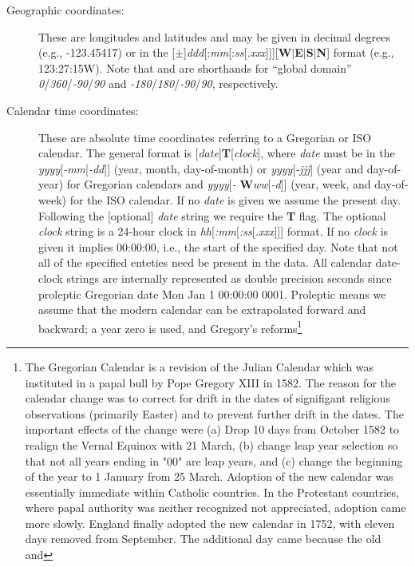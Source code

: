\begin{description}
\item [Geographic coordinates:]  These are longitudes and latitudes and may be given in decimal degrees (e.g., -123.45417)
or in the
[$\pm$]\emph{ddd}[:\emph{mm}[:\emph{ss}[\emph{.xxx}]]][\textbf{W}$|$\textbf{E}$|$\textbf{S}$|$\textbf{N}]
format (e.g., 123:27:15W).  Note that  and  are shorthands for ``global domain''
\emph{0}/\emph{360}/\emph{-90}/\emph{90}
and  \emph{-180}/\emph{180}/\emph{-90}/\emph{90}, respectively.
\item [Calendar time coordinates:]  These are absolute time coordinates referring to a Gregorian or ISO calendar.
The general format is [\emph{date}]\textbf{T}[\emph{clock}], where \emph{date} must be in the
\emph{yyyy}[\emph{-mm}[\emph{-dd}]] (year, month, day-of-month)
or \emph{yyyy}[\emph{-jjj}] (year and day-of-year) for Gregorian calendars and \emph{yyyy}[\emph{-}{\bf
W}\emph{ww}[\emph{-d}]] (year, week, and
day-of-week) for the ISO calendar.  If no \emph{date} is given we assume the present day.  Following the
[optional] \emph{date} string we require the \textbf{T} flag.
The optional \emph{clock} string is a 24-hour clock in \emph{hh}[\emph{:mm}[\emph{:ss}[\emph{.xxx}]]] format.
If no \emph{clock} is given
it implies 00:00:00, i.e., the start of the specified day.
Note that not all of the specified enteties need be present in the data.  All calendar date-clock strings are internally represented as double precision seconds since
proleptic Gregorian date Mon Jan 1 00:00:00 0001.  Proleptic means we assume that the modern calendar
can be extrapolated forward and backward; a year zero is used, and Gregory's reforms\footnote{The Gregorian Calendar
is a revision of the Julian Calendar which was instituted in a papal bull by Pope Gregory XIII in 1582. The reason for the calendar
change was to correct for drift in the dates of signifigant religious observations (primarily Easter) and to prevent further drift
in the dates. The important effects of the change were (a) Drop 10 days from October 1582 to realign the Vernal Equinox with 21 March,
(b) change leap year selection so that not all years ending in "00" are leap years, and (c) change the beginning of the year to
1 January from 25 March.  Adoption of the new calendar was essentially immediate within Catholic countries. In the Protestant countries,
where papal authority was neither recognized not appreciated, adoption came more slowly. 
England finally adopted the new calendar in 1752, with eleven days removed from September. The additional day came because the old and
}
\end{description}

